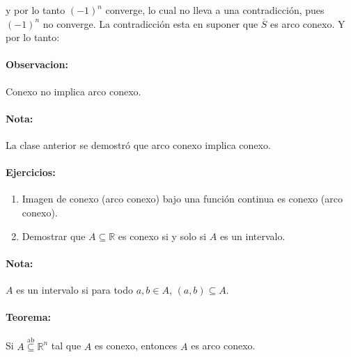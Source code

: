 \begin{itemize}
        y por lo tanto $(-1)^n$ converge, lo cual no lleva a una contradicción, pues $(-1)^n$ no converge. 
        La contradicción esta en suponer que $\overline S$ es arco conexo. Y por lo tanto:
\end{itemize}


\paragraph{Observacion:} Conexo no implica arco conexo.
\paragraph{Nota:}La clase anterior se demostró que arco conexo implica conexo.

\paragraph{Ejercicios:}
\begin{enumerate}
    \item  Imagen de conexo (arco conexo) bajo una función continua es conexo (arco conexo).
    \item Demostrar que $A\subseteq \mathbb R$ es conexo si y solo si $A$ es un intervalo.
\end{enumerate}

\paragraph{Nota:} $A$ es un intervalo si para todo $a,b \in A$, $(a,b) \subseteq A$.

\paragraph{Teorema:} Si $A \overset{\text{ab}}\subseteq \mathbb R^n$ tal que $A$ es conexo, entonces $A$ es arco conexo.

